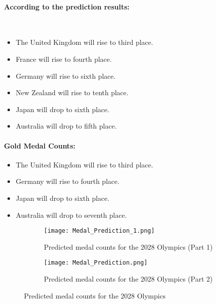 \documentclass[12pt]{article}
\begin{document}
\paragraph{According to the prediction results:} \

\begin{itemize}
    \item The United Kingdom will rise to third place.
    \item France will rise to fourth place.
    \item Germany will rise to sixth place.
    \item New Zealand will rise to tenth place.
    \item Japan will drop to sixth place.
    \item Australia will drop to fifth place.
\end{itemize}

\paragraph{Gold Medal Counts:}
\begin{itemize}
    \item The United Kingdom will rise to third place.
    \item Germany will rise to fourth place.
    \item Japan will drop to sixth place.
    \item Australia will drop to seventh place.
\end{itemize}

\begin{figure}[H]
    \centering
    \begin{subfigure}[b]{0.45\textwidth}
        \texttt{[image: Medal\_Prediction\_1.png]}
        \caption{Predicted medal counts for the 2028 Olympics (Part 1)}
        \label{fig:medal_prediction_1}
    \end{subfigure}
    \hfill
    \begin{subfigure}[b]{0.45\textwidth}
        \texttt{[image: Medal\_Prediction.png]}
        \caption{Predicted medal counts for the 2028 Olympics (Part 2)}
        \label{fig:medal_prediction_2}
    \end{subfigure}
    \caption{Predicted medal counts for the 2028 Olympics}
    \label{fig:medal_predictions}
\end{figure}
\end{document}
